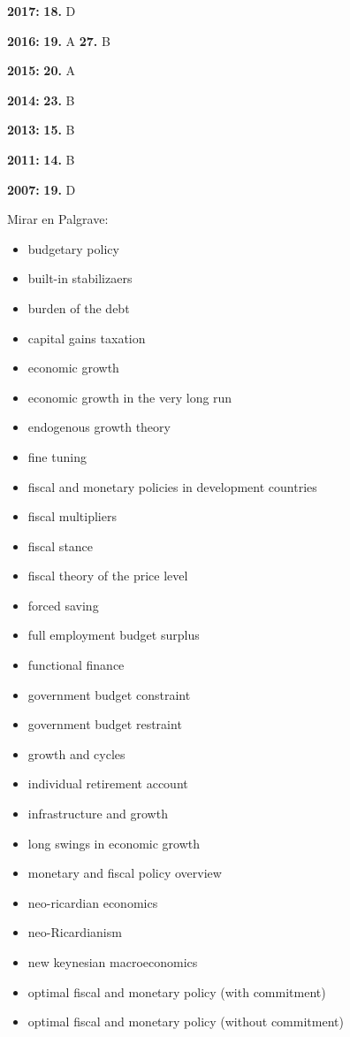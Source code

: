 \documentclass{nuevotema}
\begin{document}
\notas

\textbf{2017:} \textbf{18.} D

\textbf{2016:} \textbf{19.} A \textbf{27.} B

\textbf{2015:} \textbf{20.} A

\textbf{2014:} \textbf{23.} B

\textbf{2013:} \textbf{15.} B

\textbf{2011:} \textbf{14.} B

\textbf{2007:} \textbf{19.} D

\bibliografia

Mirar en Palgrave:
\begin{itemize}
	\item budgetary policy
	\item built-in stabilizaers
	\item burden of the debt
	\item capital gains taxation
	\item economic growth
	\item economic growth in the very long run
	\item endogenous growth theory
	\item fine tuning
	\item fiscal and monetary policies in development countries
	\item fiscal multipliers
	\item fiscal stance
	\item fiscal theory of the price level
	\item forced saving
	\item full employment budget surplus
	\item functional finance
	\item government budget constraint
	\item government budget restraint
	\item growth and cycles
	\item individual retirement account
	\item infrastructure and growth
	\item long swings in economic growth
	\item monetary and fiscal policy overview
	\item neo-ricardian economics
	\item neo-Ricardianism
	\item new keynesian macroeconomics
	\item optimal fiscal and monetary policy (with commitment)
	\item optimal fiscal and monetary policy (without commitment)

\end{itemize}
\end{document}
